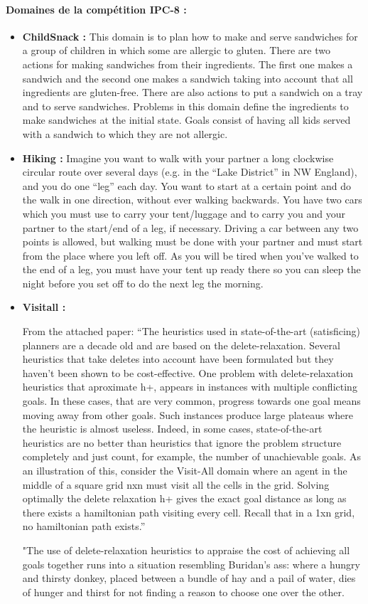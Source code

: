 \paragraph*{Domaines de la compétition IPC-8 :}
\begin{itemize}
\item \textbf{ChildSnack :}
{\color{red}This domain is to plan how to make and serve sandwiches for a group of children in which some are allergic to gluten. There are two actions for making sandwiches from their ingredients. The first one makes a sandwich and the second one makes a sandwich taking into account that all ingredients are gluten-free. There are also actions to put a sandwich on a tray and to serve sandwiches.
Problems in this domain define the ingredients to make sandwiches at the initial state. Goals consist of having all kids served with a sandwich to which they are not allergic.}
\item \textbf{Hiking :}
{\color{red}Imagine you want to walk with your partner a long clockwise circular route over several days (e.g. in the \enquote{Lake District} in NW England), and you do one \enquote{leg} each day. You want to start at a certain point and do the walk in one direction, without ever walking backwards. You have two cars which you must use to carry your tent/luggage and to carry you and your partner to the start/end of a leg, if necessary. Driving a car between any two points is allowed, but walking must be done with your partner and must start from the place where you left off. As you will be tired when you've walked to the end of a leg, you must have your tent up ready there so you can sleep the night before you set off to do the next leg the morning.}
\item \textbf{Visitall :}
{\color{red}From the attached paper: \enquote{The heuristics used in state-of-the-art (satisficing) planners are a decade old and are based on the delete-relaxation. Several heuristics that take deletes into account have been formulated but they haven’t been shown to be cost-effective. One problem with delete-relaxation heuristics that aproximate h+, appears in instances with multiple conflicting goals. In these cases, that are very common, progress towards one goal means moving away from other goals. Such instances produce large plateaus where the heuristic is almost useless. Indeed, in some cases, state-of-the-art heuristics are no better than heuristics that ignore the problem structure completely and just count, for example, the number of unachievable goals. As an illustration of this, consider the Visit-All domain where an agent in the middle of a square grid nxn must visit all the cells in the grid. Solving optimally the delete relaxation h+ gives the exact goal distance as long as there exists a hamiltonian path visiting every cell. Recall that in a 1xn grid, no hamiltonian path exists.}

"The use of delete-relaxation heuristics to appraise the cost of achieving all goals together runs into a situation resembling Buridan’s ass: where a hungry and thirsty donkey, placed between a bundle of hay and a pail of water, dies of hunger and thirst for not finding a reason to choose one over the other.}
\end{itemize}
